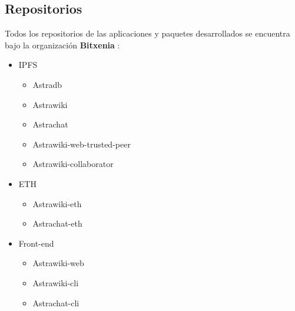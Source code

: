\subsection{Repositorios}

Todos los repositorios de las aplicaciones y paquetes desarrollados se encuentra bajo la organización \textbf{Bitxenia} \cite{bitxenia}:

\begin{itemize}
    \item IPFS
    \begin{itemize}
        \item Astradb \cite{astradb}
        \item Astrawiki \cite{astrawiki-ipfs}
        \item Astrachat \cite{astrachat-ipfs}
        \item Astrawiki-web-trusted-peer \cite{astrawiki-web-trusted-peer}
        \item Astrawiki-collaborator \cite{astrawiki-collaborator}
    \end{itemize}

    \item ETH
    \begin{itemize}
        \item Astrawiki-eth \cite{astrawiki-eth}
        \item Astrachat-eth \cite{astrachat-eth}
    \end{itemize}

    \item Front-end
    \begin{itemize}
        \item Astrawiki-web \cite{astrawiki-web}
        \item Astrawiki-cli \cite{astrawiki-cli}
        \item Astrachat-cli \cite{astrachat-cli}
    \end{itemize}
\end{itemize}